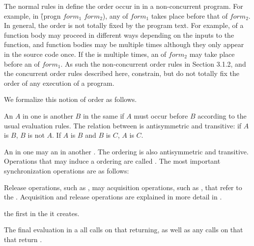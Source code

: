 
The normal  rules in \secref\EvaluationModel
define the order  occur in in a non-concurrent
program. For example, in \f{(progn $form_1$ $form_2$)}, any
 of $form_1$ takes place before that of $form_2$. In
general, the  order is not totally fixed by the
program text. For example,  of a function body may
proceed in different ways depending on the inputs to the function, and
function bodies may be  multiple times although they
only appear in the source code once. If the 
 is  multiple times, an 
of $form_2$ may take place before an  of $form_1$. As
such the non-concurrent  order rules in Section
3.1.2, and the concurrent order rules described here, constrain, but
do not totally fix the  order of any execution of a
program.

We formalize this notion of  order as follows.

An  $A$ in one  is
 another  $B$ in the same
 if $A$ must occur before $B$ according to the usual
evaluation rules. The  relation between
 is antisymmetric and transitive: if $A$ is
 $B$, $B$ is not 
$A$. If $A$ is  $B$ and $B$ is
 $C$, $A$ is  $C$.

An  in one  may 
an  in another . The
 ordering is also antisymmetric and
transitive. Operations that may induce a 
ordering are called . The most
important synchronization operations are as follows:

\beginlist
\item{\bull} Release operations, such as , may
   acquisition operations, such as
  , that refer to the 
  . Acquisition and release operations are explained in
  more detail in \secref{}.
\item{\bull}   the first
   in the  it creates.
\item{\bull} The final evaluation in a 
   all  calls on that
   returning, as well as any 
  calls on that  that return .
\endlist

